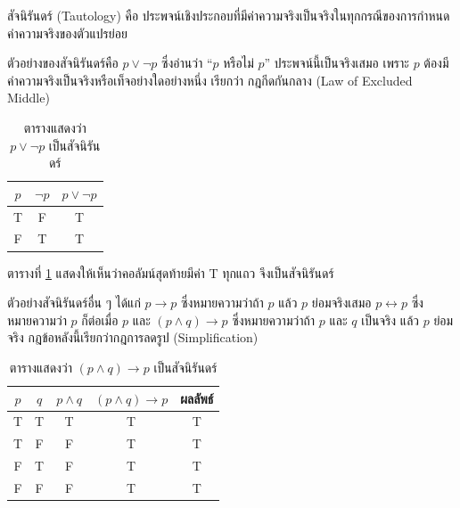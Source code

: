 \begin{definition}[สัจนิรันดร์]
สัจนิรันดร์ (Tautology) คือ ประพจน์เชิงประกอบที่มีค่าความจริงเป็นจริงในทุกกรณีของการกำหนดค่าความจริงของตัวแปรย่อย
\end{definition}

ตัวอย่างของสัจนิรันดร์คือ $p \lor \neg p$ ซึ่งอ่านว่า ``$p$ หรือไม่ $p$'' ประพจน์นี้เป็นจริงเสมอ เพราะ $p$ ต้องมีค่าความจริงเป็นจริงหรือเท็จอย่างใดอย่างหนึ่ง เรียกว่า กฎกีดกันกลาง (Law of Excluded Middle)~\parencite{rosen2019discrete}

\begin{table}[H]
    \centering
    \caption{ตารางแสดงว่า $p \lor \neg p$ เป็นสัจนิรันดร์}
    \label{tab:tautology-law-excluded}
    \begin{tabular}{|c|c|c|}
        \hline
        \textbf{$p$} & \textbf{$\neg p$} & \textbf{$p \lor \neg p$} \\ \hline
        T & F & T \\ \hline
        F & T & T \\ \hline
    \end{tabular}
\end{table}

ตารางที่ \ref{tab:tautology-law-excluded} แสดงให้เห็นว่าคอลัมน์สุดท้ายมีค่า T ทุกแถว จึงเป็นสัจนิรันดร์

ตัวอย่างสัจนิรันดร์อื่น ๆ ได้แก่ $p \rightarrow p$ ซึ่งหมายความว่าถ้า $p$ แล้ว $p$ ย่อมจริงเสมอ $p \leftrightarrow p$ ซึ่งหมายความว่า $p$ ก็ต่อเมื่อ $p$ และ $(p \land q) \rightarrow p$ ซึ่งหมายความว่าถ้า $p$ และ $q$ เป็นจริง แล้ว $p$ ย่อมจริง กฎข้อหลังนี้เรียกว่ากฎการลดรูป (Simplification)

\begin{table}[H]
    \centering
    \caption{ตารางแสดงว่า $(p \land q) \rightarrow p$ เป็นสัจนิรันดร์}
    \label{tab:tautology-simplification}
    \begin{tabular}{|c|c|c|c|c|}
        \hline
        \textbf{$p$} & \textbf{$q$} & \textbf{$p \land q$} & \textbf{$(p \land q) \rightarrow p$} & \textbf{ผลลัพธ์} \\ \hline
        T & T & T & T & T \\ \hline
        T & F & F & T & T \\ \hline
        F & T & F & T & T \\ \hline
        F & F & F & T & T \\ \hline
    \end{tabular}
\end{table}

